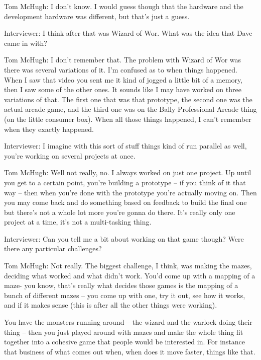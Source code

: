 \textcolor{interviewee}{Tom McHugh:} I don’t know. I would guess though that the hardware and the development hardware was different, but that’s just a guess.

\textcolor{interviewer}{Interviewer:} I think after that was Wizard of Wor. What was the idea that Dave came in with?

\textcolor{interviewee}{Tom McHugh:} I don’t remember that. The problem with Wizard of Wor was there was several variations of it. I’m confused as to when things happened. When I saw that video you sent me it kind of jogged a little bit of a memory, then I saw some of the other ones. It sounds like I may have worked on three variations of that. The first one that was that prototype, the second one was the actual arcade game, and the third one was on the Bally Professional Arcade thing (on the little consumer box). When all those things happened, I can’t remember when they exactly happened.

\textcolor{interviewer}{Interviewer:} I imagine with this sort of stuff things kind of run parallel as well, you’re working on several projects at once.

\textcolor{interviewee}{Tom McHugh:} Well not really, no. I always worked on just one project. Up until you get to a certain point, you’re building a prototype – if you think of it that way – then when you’re done with the prototype you’re actually moving on. Then you may come back and do something based on feedback to build the final one but there’s not a whole lot more you’re gonna do there. It’s really only one project at a time, it’s not a multi-tasking thing.

\textcolor{interviewer}{Interviewer:} Can you tell me a bit about working on that game though? Were there any particular challenges?

\textcolor{interviewee}{Tom McHugh:} Not really. The biggest challenge, I think, was making the mazes, deciding what worked and what didn’t work. You’d come up with a mapping of a maze- you know, that’s really what decides those games is the mapping of a bunch of different mazes – you come up with one, try it out, see how it works, and if it makes sense (this is after all the other things were working).

You have the monsters running around – the wizard and the warlock doing their thing – then you just played around with mazes and make the whole thing fit together into a cohesive game that people would be interested in. For instance that business of what comes out when, when does it move faster, things like that.

